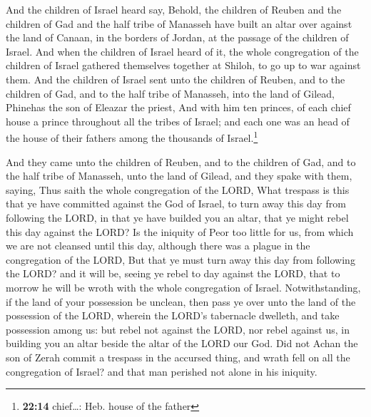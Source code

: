 And the children of Israel heard say, Behold, the
children of Reuben and the children of Gad and the half tribe of
Manasseh have built an altar over against the land of Canaan, in the
borders of Jordan, at the passage of the children of Israel.
 And when the children of Israel heard of it, the whole
congregation of the children of Israel gathered themselves together at
Shiloh, to go up to war against them.  And the children
of Israel sent unto the children of Reuben, and to the children of Gad,
and to the half tribe of Manasseh, into the land of Gilead, Phinehas the
son of Eleazar the priest,  And with him ten princes, of
each chief house a prince throughout all the tribes of Israel; and each
one was an head of the house of their fathers among the thousands of
Israel.\footnote{\textbf{22:14} chief\ldots: Heb. house of the father}

 And they came unto the children of Reuben, and to the
children of Gad, and to the half tribe of Manasseh, unto the land of
Gilead, and they spake with them, saying,  Thus saith the
whole congregation of the LORD, What trespass is this that ye have
committed against the God of Israel, to turn away this day from
following the LORD, in that ye have builded you an altar, that ye might
rebel this day against the LORD?  Is the iniquity of Peor
too little for us, from which we are not cleansed until this day,
although there was a plague in the congregation of the LORD,
 But that ye must turn away this day from following the
LORD? and it will be, seeing ye rebel to day against the LORD, that to
morrow he will be wroth with the whole congregation of Israel.
 Notwithstanding, if the land of your possession be
unclean, then pass ye over unto the land of the possession of the LORD,
wherein the LORD's tabernacle dwelleth, and take possession among us:
but rebel not against the LORD, nor rebel against us, in building you an
altar beside the altar of the LORD our God.  Did not
Achan the son of Zerah commit a trespass in the accursed thing, and
wrath fell on all the congregation of Israel? and that man perished not
alone in his iniquity.

